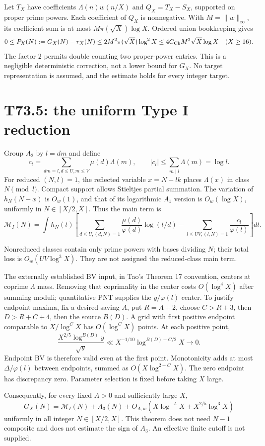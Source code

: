 \documentclass[11pt,a4paper]{article}
\begin{document}
Let $T_X$ have coefficients $\Lambda(n)w(n/X)$ and $Q_X=T_X-S_X$, supported on proper prime powers. Each coefficient of $Q_X$ is nonnegative. With $M=\|w\|_\infty$, its coefficient sum is at most $M\pi(\sqrt X)\log X$. Ordered union bookkeeping gives
\[
 0\le P_X(N):=G_X(N)-r_X(N)
 \le2M^2\pi(\sqrt X)\log^2X
 \le4C_{\rm Ch}M^2\sqrt X\log X\quad(X\ge16).
\]
The factor 2 permits double counting two proper-power entries. This is a negligible deterministic correction, not a lower bound for $G_X$. No target representation is assumed, and the estimate holds for every integer target.
\newpage
\section{T73.5: the uniform Type I reduction}
Group $A_2$ by $l=dm$ and define
\[
 c_l=\sum_{dm=l,d\le U,m\le V}\mu(d)\Lambda(m),\qquad
 |c_l|\le\sum_{m\mid l}\Lambda(m)=\log l.
\]
For reduced $(N,l)=1$, the reflected variable $x=N-lk$ places $\Lambda(x)$ in class $N\pmod l$. Compact support allows Stieltjes partial summation. The variation of $h_N(N-x)$ is $O_w(1)$, and that of its logarithmic $A_1$ version is $O_w(\log X)$, uniformly in $N\in[X/2,X]$. Thus the main term is
\[
 \mathcal M_I(N)=\int h_N(t)\left[
 \sum_{d\le U,(d,N)=1}\frac{\mu(d)}{\varphi(d)}\log(t/d)
 -\sum_{l\le UV,(l,N)=1}\frac{c_l}{\varphi(l)}\right]dt.
\]
{\raggedright Nonreduced classes contain only prime powers with bases dividing $N$; their total loss is $O_w(UV\log^3X)$. They are not assigned the reduced-class main term.\par}

The externally established BV input, in Tao's Theorem 17 convention, centers at coprime $\Lambda$ mass. Removing that coprimality in the center costs $O(\log^4X)$ after summing moduli; quantitative PNT supplies the $y/\varphi(l)$ center. To justify endpoint maxima, fix a desired saving $A$, put $R=A+2$, choose $C>R+3$, then $D>R+C+4$, then the source $B(D)$. A grid with first positive endpoint comparable to $X/\log^CX$ has $O(\log^CX)$ points. At each positive point,
\[
 \frac{X^{2/5}\log^{B(D)} y}{\sqrt y}
 \ll X^{-1/10}\log^{B(D)+C/2}X\longrightarrow0.
\]
Endpoint BV is therefore valid even at the first point. Monotonicity adds at most $\Delta/\varphi(l)$ between endpoints, summed as $O(X\log^{2-C}X)$. The zero endpoint has discrepancy zero. Parameter selection is fixed before taking $X$ large.

Consequently, for every fixed $A>0$ and sufficiently large $X$,
\[
 G_X(N)=\mathcal M_I(N)+A_3(N)
 +O_{A,w}(X\log^{-A}X+X^{2/5}\log^3X)
\]
uniformly in all integer $N\in[X/2,X]$. This theorem does not need $N-1$ composite and does not estimate the sign of $A_3$. An effective finite cutoff is not supplied.
\newpage
\end{document}
